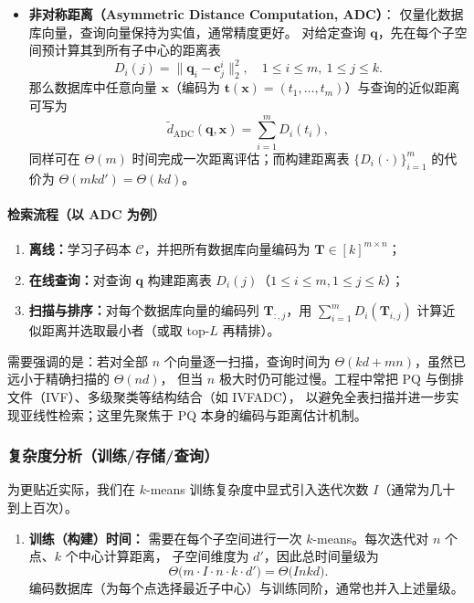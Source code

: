 \documentclass[lang=cn,newtx,10pt,scheme=chinese,chinesefont=nofont,citestyle=gb7714-2015, bibstyle=gb7714-2015]{elegantbook}
\begin{document}
\begin{refsection}
\begin{itemize}
\item \textbf{非对称距离（Asymmetric Distance Computation, ADC）}：
仅量化数据库向量，查询向量保持为实值，通常精度更好。
对给定查询 $\mathbf{q}$，先在每个子空间预计算其到所有子中心的距离表
\begin{equation}
D_i(j)=\|\mathbf{q}_i-\mathbf{c}_j^i\|_2^2,\quad 1\le i\le m,\ 1\le j\le k.
\end{equation}
那么数据库中任意向量 $\mathbf{x}$（编码为 $\mathbf{t}(\mathbf{x})=(t_1,\ldots,t_m)$）与查询的近似距离可写为
\begin{equation}
\widetilde{d}_{\mathrm{ADC}}(\mathbf{q},\mathbf{x})
=\sum_{i=1}^m D_i(t_i),
\end{equation}
同样可在 $\Theta(m)$ 时间完成一次距离评估；而构建距离表 $\{D_i(\cdot)\}_{i=1}^m$ 的代价为
$\Theta(mkd')=\Theta(kd)$。
\end{itemize}

\paragraph{检索流程（以 ADC 为例）}
\begin{enumerate}
\item \textbf{离线：}学习子码本 $\mathcal{C}$，并把所有数据库向量编码为 $\mathbf{T}\in [k]^{m\times n}$；
\item \textbf{在线查询：}对查询 $\mathbf{q}$ 构建距离表 $D_i(j)$（$1\le i\le m,1\le j\le k$）；
\item \textbf{扫描与排序：}对每个数据库向量的编码列 $\mathbf{T}_{:,j}$，用
$\sum_{i=1}^m D_i(\mathbf{T}_{i,j})$ 计算近似距离并选取最小者（或取 top-$L$ 再精排）。
\end{enumerate}
需要强调的是：若对全部 $n$ 个向量逐一扫描，查询时间为 $\Theta(kd+mn)$，虽然已远小于精确扫描的 $\Theta(nd)$，
但当 $n$ 极大时仍可能过慢。工程中常把 PQ 与倒排文件（IVF）、多级聚类等结构结合（如 IVFADC），
以避免全表扫描并进一步实现亚线性检索；这里先聚焦于 PQ 本身的编码与距离估计机制。

\subsubsection{复杂度分析（训练/存储/查询）}
为更贴近实际，我们在 $k$-means 训练复杂度中显式引入迭代次数 $I$（通常为几十到上百次）。
\begin{enumerate}
\item \textbf{训练（构建）时间：}
需要在每个子空间进行一次 $k$-means。每次迭代对 $n$ 个点、$k$ 个中心计算距离，
子空间维度为 $d'$，因此总时间量级为
\[
\Theta\!\big(m\cdot I\cdot n\cdot k\cdot d'\big)=\Theta\!\big(I n k d\big).
\]
编码数据库（为每个点选择最近子中心）与训练同阶，通常也并入上述量级。


\end{enumerate}
\end{refsection}
\end{document}

